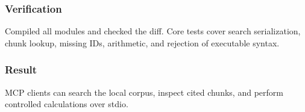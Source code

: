 \subsubsection{Verification}

Compiled all modules and checked the diff. Core tests cover search serialization, chunk lookup, missing IDs, arithmetic, and rejection of executable syntax.

\subsubsection{Result}

MCP clients can search the local corpus, inspect cited chunks, and perform controlled calculations over stdio.

